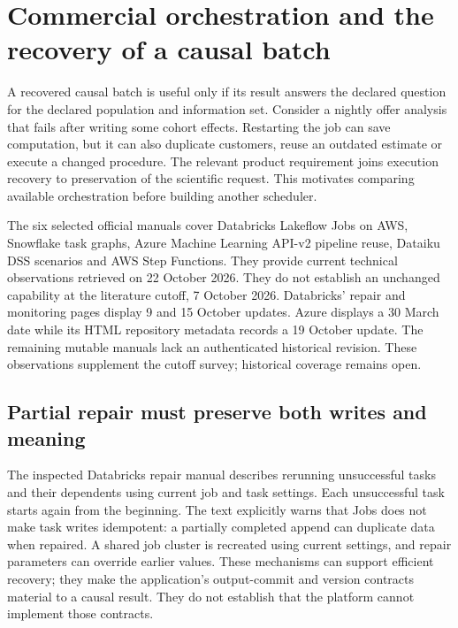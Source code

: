 \section{Commercial orchestration and the recovery of a causal batch}
\label{exec22:workflow-scope}

A recovered causal batch is useful only if its result answers the declared
question for the declared population and information set. Consider a nightly
offer analysis that fails after writing some cohort effects. Restarting the job
can save computation, but it can also duplicate customers, reuse an outdated
estimate or execute a changed procedure. The relevant product requirement joins
execution recovery to preservation of the scientific request. This motivates
comparing available orchestration before building another scheduler.

The six selected official manuals cover Databricks Lakeflow Jobs on AWS,
Snowflake task graphs, Azure Machine Learning API-v2 pipeline reuse, Dataiku
DSS scenarios and AWS Step Functions. They provide current technical
observations retrieved on 22 October 2026. They do not establish an unchanged
capability at the literature cutoff, 7 October 2026. Databricks' repair and
monitoring pages display 9 and 15 October updates. Azure displays a 30 March
date while its HTML repository metadata records a 19 October update. The
remaining mutable manuals lack an authenticated historical revision. These
observations supplement the cutoff survey; historical coverage remains open.
\citep{exec22_workflow_databricks_repair,exec22_workflow_databricks_monitor,
exec22_workflow_azure_reuse,exec22_workflow_snowflake_graphs,
exec22_workflow_dataiku_scenarios,exec22_workflow_aws_errors}

\subsection{Partial repair must preserve both writes and meaning}

The inspected Databricks repair manual describes rerunning unsuccessful tasks
and their dependents using current job and task settings. Each unsuccessful
task starts again from the beginning. The text explicitly warns that Jobs does
not make task writes idempotent: a partially completed append can duplicate data
when repaired. A shared job cluster is recreated using current settings, and
repair parameters can override earlier values. These mechanisms can support
efficient recovery; they make the application's output-commit and version
contracts material to a causal result. They do not establish that the platform
cannot implement those contracts.\citep{exec22_workflow_databricks_repair}

